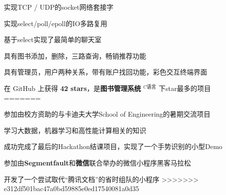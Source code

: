 \documentclass[]{deedy-resume-openfont}
\begin{document}
\begin{minipage}[t]{0.73\textwidth}
\begin{tightemize}
    \item 实现TCP / UDP的socket网络套接字
    \item 实现select/poll/epoll的IO多路复用
    \item 基于select实现了最简单的聊天室
    \end{tightemize}
\sectionsep

\begin{tightemize}
    \item 具有图书添加，删除，三路查询，畅销推荐功能
    \item 具有管理员，用户两种关系，带有账户找回功能，彩色交互终端界面
    \item 在 GitHub 上获得 \textbf{42 stars}，是\textbf{图书管理系统} $^{C语言}$ 下star最多的项目
=======
\begin{tightemize}
    \item 参加由校方资助的与卡迪夫大学School of Engineering的暑期交流项目
    \item 学习大数据，机器学习和高性能计算相关的知识
    \item 成功完成了最后的Hackathon结课项目，实现了一个手势识别的小型Demo
    \end{tightemize}
\sectionsep

\begin{tightemize}
    \item 参加由\textbf{Segmentfault}和\textbf{微信}联合举办的微信小程序黑客马拉松
    \item 开发了一个尝试取代“腾讯文档”的省时组队的小程序
>>>>>>> e312df501bac47a0bd59885e0ed17540081a0d35
    \end{tightemize}
\sectionsep






\end{tightemize}
\end{minipage}
\end{document}
